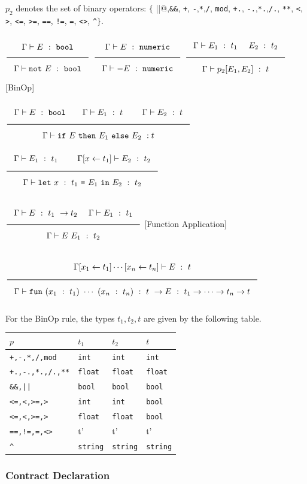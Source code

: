 \documentclass[a4paper]{article}
\newcommand{\Rule}[2]{\genfrac{}{}{0.7pt}{}{{\setlength{\fboxrule}{0pt}\setlength{\fboxsep}{3mm}\fbox{$#1$}}}{{\setlength{\fboxrule}{0pt}\setlength{\fboxsep}{3mm}\fbox{$#2$}}}}
\newcommand{\Int}{\texttt{int}}
\newcommand{\Float}{\texttt{float}}
\newcommand{\String}{\texttt{string}}
\newcommand{\Num}{\texttt{numeric}}
\newcommand{\Bool}{\texttt{bool}}
\begin{document}
$p_2$ denotes the set of binary operators: $\{$
\verb@||@,\verb#&&#,
\verb#+#, \verb#-#,\verb#*#,\verb#/#, \verb#mod#,
\verb#+.#, \verb#-.#,\verb#*.#,\verb#/.#, \verb#**#,
\verb#<#, \verb#>#, \verb#<=#, \verb#>=#, \verb#==#, \verb#!=#, \verb#=#, \verb#<>#, \verb#^#$\}$.

$\Rule{\Gamma \vdash E\ :\ \Bool}{\Gamma \vdash \texttt{not}\ E\ :\ \Bool}$
\hfill
$\Rule{\Gamma \vdash E\ :\ \Num}{\Gamma \vdash - E\ :\ \Num}$
\hfill
$\Rule{\Gamma \vdash E_1\ :\ t_1\ \quad E_2\ :\ t_2}{\Gamma \vdash p_2[E_1, E_2]\ :\ t}$ [BinOp]

$\Rule{\Gamma \vdash E\ :\ \Bool \qquad \Gamma \vdash E_1\ :\ t\ \qquad \Gamma \vdash E_2\ :\ t}{\Gamma \vdash \texttt{if}\ E\ \texttt{then}\ E_1\ \texttt{else}\ E_2\ : t}$
\hfill
$\Rule{\Gamma \vdash E_1\ :\ t_1\ \qquad \Gamma [x \leftarrow t_1] \vdash E_2\ :\ t_2}{\Gamma \vdash \texttt{let}\ x\ :\ t_1\ \texttt{=}\ E_1\ \texttt{in}\ E_2\ :\ t_2}$

$\Rule{\Gamma \vdash E\ :\ t_1\ \rightarrow t_2\ \quad \Gamma \vdash E_1\ :\ t_1}{\Gamma \vdash E\ E_1\ :\ t_2}$ [Function Application]

$\Rule{\Gamma [x_1 \leftarrow t_1] \cdots [x_n \leftarrow t_n] \vdash E\ :\ t}
{\Gamma \vdash \texttt{fun}\ (x_1\ :\ t_1)\ \cdots\ (x_n\ :\ t_n)\ :\ t\ \rightarrow E\ :\ t_1 \rightarrow \cdots \rightarrow t_n \rightarrow t}$

For the BinOp rule, the types $t_1, t_2, t$ are given by the following table.

\begin{tabular}{|l||l|l|l|} \hline
$p$ & $t_1$ & $t_2$ & $t$ \\ \hline \hline
\verb#+,-,*,/,mod# & \Int & \Int & \Int \\ \hline
\verb#+.,-.,*.,/.,**# & \Float & \Float & \Float \\ \hline
\verb#&&,||#  & \Bool & \Bool & \Bool \\ \hline
\verb#<=,<,>=,># & \Int & \Int & \Bool \\ \hline
\verb#<=,<,>=,># & \Float & \Float & \Bool \\ \hline
\verb#==,!=,=,<># & t' & t' & t' \\ \hline
\verb#^# & \String & \String & \String \\ \hline
\end{tabular}
\vspace{3mm}

\subsubsection{Contract Declaration}
\end{document}
